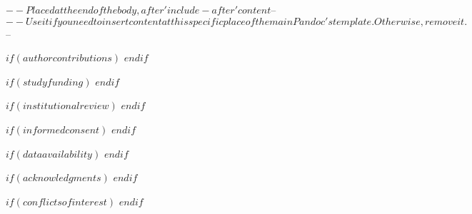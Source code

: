 $-- Placed at the end of the body, after 'include-after' content
$-- %
$-- Use it if you need to insert content at this specific place of the main Pandoc's template. Otherwise, remove it.
$-- %


$if(authorcontributions)$
$endif$

$if(studyfunding)$
$endif$

$if(institutionalreview)$
$endif$

$if(informedconsent)$
$endif$

$if(dataavailability)$
$endif$

$if(acknowledgments)$
$endif$

$if(conflictsofinterest)$
$endif$
